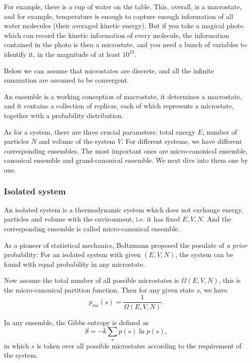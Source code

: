For example, there is a cup of water on the table. This, overall, is a macrostate, and for example, temperature is enough to capture enough information of all water molecules (their averaged kinetic energy). But if you take a magical photo which can record the kinetic information of every molecule, the information contained in the photo is then a microstate, and you need a bunch of variables to identify it, in the magnitude of at least $10^{23}$.

Below we can assume that microstates are discrete, and all the infinite summation are assumed to be convergent.

An ensemble is a working conception of macrostate, it determines a macrostate, and it contains a collection of replicas, each of which represents a microstate, together with a probability distribution.

As for a system, there are three crucial parameters: total energy $E$, number of particles $N$ and volume of the system $V$. For different systems, we have different corresponding ensembles. The most important ones are micro-canonical ensemble, canonical ensemble and grand-canonical ensemble. We next dive into them one by one.

\subsubsection{Isolated system}
An isolated system is a thermodynamic system which does not exchange energy, particles and volume with the environment, i.e. it has fixed $E,V,N$. And the corresponding ensemble is called micro-canonical ensemble.

As a pioneer of statistical mechanics, Boltzmann proposed the posulate of \textit{a prior} probability: For an isolated system with given $(E,V,N)$, the system can be found with equal probability in any microstate.

Now assume the total number of all possible microstates is $\Omega(E,V,N)$, this is the micro-canonical partition function. Then for any given state $s$, we have
\begin{equation}
	p_{mc}(s) = \frac{1}{\Omega(E,V,N)}.
\end{equation}

In any ensemble, the Gibbs entropy is defined as
\begin{equation}
	S=-k\sum_s p(s)\ln p(s),
\end{equation}
in which $s$ is taken over all possible microstates according to the requirement of the system.

